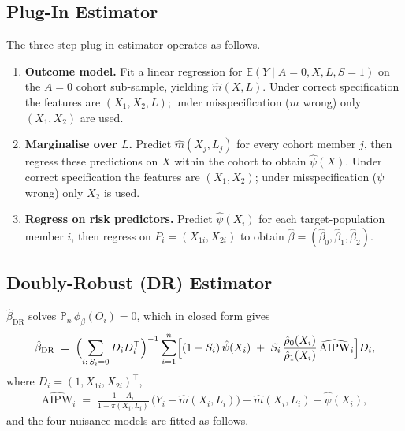 \subsection*{Plug-In Estimator}

The three-step plug-in estimator operates as follows.

\begin{enumerate}
  \item \textbf{Outcome model.}
    Fit a linear regression for $\mathbb{E}(Y \mid A=0, X, L, S=1)$
    on the $A=0$ cohort sub-sample, yielding $\hat{m}(X, L)$.
    Under correct specification the features are $(X_1, X_2, L)$;
    under misspecification ($m$ wrong) only $(X_1, X_2)$ are used.

  \item \textbf{Marginalise over $L$.}
    Predict $\hat{m}(X_j, L_j)$ for every cohort member $j$,
    then regress these predictions on $X$ within the cohort to obtain
    $\hat{\psi}(X)$.
    Under correct specification the features are $(X_1, X_2)$;
    under misspecification ($\psi$ wrong) only $X_2$ is used.

  \item \textbf{Regress on risk predictors.}
    Predict $\hat{\psi}(X_i)$ for each target-population member $i$,
    then regress on $P_i = (X_{1i}, X_{2i})$ to obtain
    $\hat{\beta} = (\hat\beta_0, \hat\beta_1, \hat\beta_2)$.
\end{enumerate}

\subsection*{Doubly-Robust (DR) Estimator}

$\hat\beta_{\mathrm{DR}}$ solves $\mathbb{P}_n\,\phi_\beta(O_i) = 0$,
which in closed form gives
\begin{align}
  \hat\beta_{\mathrm{DR}}
  \;=\;
  \Bigl(\sum_{i:\,S_i=0} D_i D_i^\top\Bigr)^{-1}
  \sum_{i=1}^n
  \Bigl[
    (1-S_i)\,\hat\psi(X_i)
    \;+\;
    S_i\,\frac{\hat\rho_0(X_i)}{\hat\rho_1(X_i)}\,\widehat{\mathrm{AIPW}}_i
  \Bigr] D_i,
\end{align}
where $D_i = (1, X_{1i}, X_{2i})^\top$,
\begin{align}
  \widehat{\mathrm{AIPW}}_i
  \;=\;
  \frac{1-A_i}{1-\hat\pi(X_i,L_i)}\,\bigl(Y_i - \hat m(X_i,L_i)\bigr)
  + \hat m(X_i,L_i) - \hat\psi(X_i),
\end{align}
and the four nuisance models are fitted as follows.

